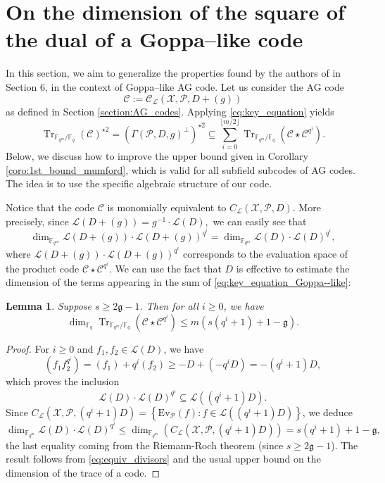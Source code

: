 \documentclass[a4paper]{article}
\newtheorem{lemma}[thm]{Lemma}
\theoremstyle{definition}
\theoremstyle{remark}
\newcommand{\calP}{\mathcal{P}}
\newcommand{\calL}{\mathcal{L}}
\newcommand{\calC}{\mathcal{C}}
\newcommand{\calX}{\mathcal{X}}
\newcommand{\fqm}{\mathbb{F}_{q^m}}
\newcommand{\fq}{\mathbb{F}_{q}}
\newcommand{\Tr}[1]{\operatorname{Tr}_{\mathbb{F}_{q^m}/\fq}\left(#1\right)}
\newcommand{\set}[1]{\left\{#1\right\}}
\begin{document}
\section{On the dimension of the square of the dual of a Goppa--like code}

In this section, we aim to generalize the properties found by the authors of \cite{MT21} in Section 6, in the context of Goppa--like AG code. Let us consider the AG code 
$$\calC := \calC_{\calL}(\calX,\calP,D+(g))$$
as defined in Section \ref{section:AG_codes}. Applying \eqref{eq:key_equation} yields   
\begin{equation} \label{eq:key_equation_Goppa--like} 
\Tr{\calC}^{\star 2} = (\Gamma(\calP,D,g)^{\perp})^{\star2} \subseteq \sum\limits_{i=0}^{\lfloor{m/2} \rfloor} \Tr{\calC\star \calC^{q^i}}.
\end{equation}
Below, we discuss how to improve the upper bound given in Corollary \ref{coro:1st_bound_mumford}, which is valid for all subfield subcodes of AG codes. The idea is to use the specific algebraic structure of our code.

\noindent Notice that the code $\calC$ is monomially equivalent to $C_{\calL}(\calX,\calP,D)$. 
More precisely, since $\calL(D+(g)) = g^{-1} \cdot \calL(D),$
we can easily see that
\begin{equation} \label{eq:equiv_divisors}
\dim_{\fqm} \calL(D+(g))\cdot \calL(D+(g))^{q^i} = \dim_{\fqm} \calL(D)\cdot \calL(D)^{q^i},
\end{equation}
where $\calL(D+(g))\cdot \calL(D+(g))^{q^i}$ corresponds to the evaluation space of the product code $\calC \star \calC^{q^i}$. We can use the fact that $D$ is effective to estimate the dimension of the terms appearing in the sum of \eqref{eq:key_equation_Goppa--like}:


\begin{lemma} \label{lem:bound_dim_Tr(C*C^q^i)}
  Suppose $s \geq 2\mathfrak{g}-1$. Then for all $i \geq 0$, we have 
   $$\dim_{\fq} \Tr{\calC\star \calC^{q^i}} \leq m\left(s\left(q^i+1\right)+1-\mathfrak{g}\right).$$
\end{lemma}

\begin{proof}
For $i \geq 0$ and $f_1,f_2 \in \calL(D)$, we have 
$$(f_1f_2^{q^i}) = (f_1)+q^i(f_2) \geq -D +(-q^iD) = -(q^i+1)D,$$
which proves the inclusion
$$ \calL(D)\cdot \calL(D)^{q^i} \subseteq \calL((q^i+1)D).$$
Since $C_{\calL}(\calX,\calP,(q^i+1)D) = \set{\mathrm{Ev}_{\calP}(f) : f \in \calL((q^i+1)D)}$, we deduce 
$$ \dim_{\fqm} \calL(D) \cdot \calL(D)^{q^i} \leq \dim_{\fqm}\left(C_{\calL}(\calX,\calP,(q^i+1)D)\right) = s(q^i+1)+1-\mathfrak{g},$$
the last equality coming from the Riemann-Roch theorem (since $s \geq 2\mathfrak{g}-1$). The result follows from \eqref{eq:equiv_divisors} and the usual upper bound on the dimension of the trace of a code. 
\end{proof}
\end{document}
